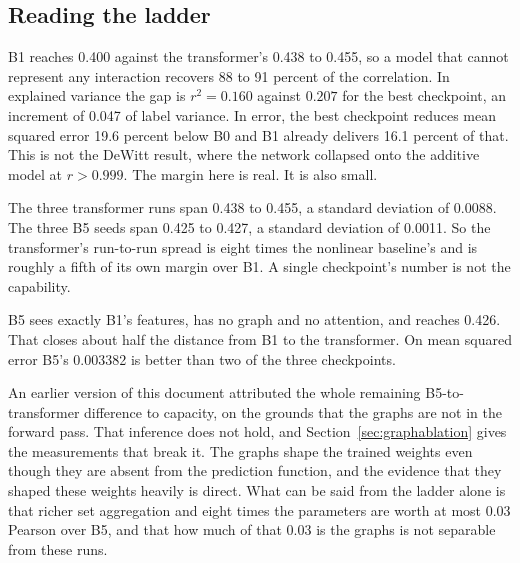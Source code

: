 
\subsection{Reading the ladder}

B1 reaches 0.400 against the transformer's 0.438 to 0.455, so a model that
cannot represent any interaction recovers 88 to 91 percent of the correlation.
In explained variance the gap is $r^2 = 0.160$ against $0.207$ for the best
checkpoint, an increment of 0.047 of label variance. In error, the best
checkpoint reduces mean squared error 19.6 percent below B0 and B1 already
delivers 16.1 percent of that. This is not the DeWitt result, where the network
collapsed onto the additive model at $r > 0.999$. The margin here is real. It is
also small.

The three transformer runs span 0.438 to 0.455, a standard deviation of 0.0088.
The three B5 seeds span 0.425 to 0.427, a standard deviation of 0.0011. So the
transformer's run-to-run spread is eight times the nonlinear baseline's and is
roughly a fifth of its own margin over B1. A single checkpoint's number is not
the capability.

B5 sees exactly B1's features, has no graph and no attention, and reaches 0.426.
That closes about half the distance from B1 to the transformer. On mean squared
error B5's 0.003382 is better than two of the three checkpoints.

An earlier version of this document attributed the whole remaining
B5-to-transformer difference to capacity, on the grounds that the graphs are not
in the forward pass. That inference does not hold, and
Section~\ref{sec:graphablation} gives the measurements that break it. The graphs
shape the trained weights even though they are absent from the prediction
function, and the evidence that they shaped these weights heavily is direct. What
can be said from the ladder alone is that richer set aggregation and eight times
the parameters are worth at most 0.03 Pearson over B5, and that how much of that
0.03 is the graphs is not separable from these runs.


